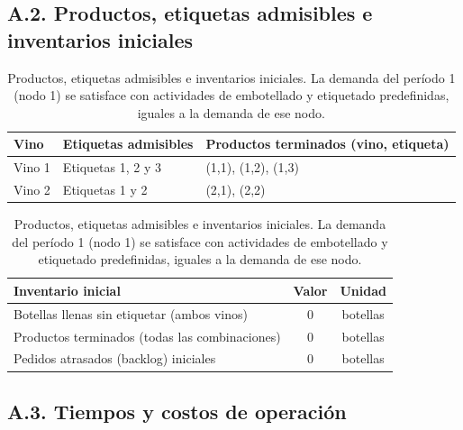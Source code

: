 \subsection*{A.2. Productos, etiquetas admisibles e inventarios iniciales}

\begin{table}[h]
  \centering
  \begin{tabular}{lll}
    \toprule
    \textbf{Vino} & \textbf{Etiquetas admisibles} & \textbf{Productos terminados (vino, etiqueta)} \\
    \midrule
    Vino 1 & Etiquetas 1, 2 y 3 & (1,1), (1,2), (1,3) \\
    Vino 2 & Etiquetas 1 y 2    & (2,1), (2,2) \\
    \bottomrule
  \end{tabular}
  \vspace{0.6em}

  \begin{tabular}{lcc}
    \toprule
    \textbf{Inventario inicial} & \textbf{Valor} & \textbf{Unidad} \\
    \midrule
    Botellas llenas sin etiquetar (ambos vinos)     & 0 & botellas \\
    Productos terminados (todas las combinaciones)  & 0 & botellas \\
    Pedidos atrasados (backlog) iniciales           & 0 & botellas \\
    \bottomrule
  \end{tabular}
  \caption{Productos, etiquetas admisibles e inventarios iniciales. La demanda
  del período 1 (nodo 1) se satisface con actividades de embotellado y
  etiquetado predefinidas, iguales a la demanda de ese nodo.}
  \label{tab:anexoA-productos}
\end{table}

\subsection*{A.3. Tiempos y costos de operación}

